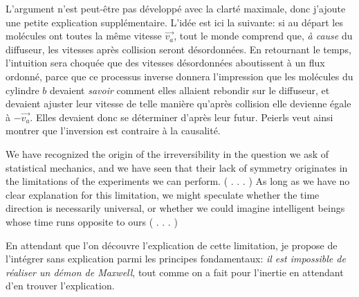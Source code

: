 \medskip
L'argument n'est peut-\^etre pas d\'evelopp\'e avec la clart\'e maximale, 
donc j'ajoute une petite explication suppl\'ementaire. L'id\'ee est ici 
la suivante: si au d\'epart les mol\'ecules ont toutes la m\^eme vitesse 
$\vec{v_a}$, tout le monde comprend que, {\it \`a cause} du diffuseur, 
les vitesses apr\`es collision seront d\'esordonn\'ees. En retournant le 
temps, l'intuition sera choqu\'ee que des vitesses d\'esordonn\'ees 
aboutissent \`a un flux ordonn\'e, parce que ce processus inverse donnera 
l'impression que les mol\'ecules du cylindre $b$ devaient {\it savoir} 
comment elles allaient rebondir sur le diffuseur, et devaient ajuster leur 
vitesse de telle mani\`ere qu'apr\`es collision elle devienne \'egale 
\`a $-\vec{v_a}$. Elles devaient donc se d\'eterminer d'apr\`es leur futur.
Peierls veut ainsi montrer que l'inversion est contraire \`a la causalit\'e. 
\medskip
{\cit We have recognized the origin of the irreversibility in the question
we ask of statistical mechanics, and we have seen that their lack of symmetry 
originates in the limitations of the experiments we can perform. ( . . . )  As
long as we have no clear explanation for this limitation, we might speculate 
whether the time direction is necessarily universal, or whether we could 
imagine intelligent beings whose time runs opposite to ours ( . . . ) \par }
\medskip
En attendant que l'on d\'ecouvre l'explication de cette limitation, je 
propose de l'int\'egrer sans explication parmi les principes fondamentaux:
{\sl il est impossible de r\'ealiser un d\'emon de Maxwell}, tout comme on 
a fait pour l'inertie en attendant d'en trouver l'explication.  

\bigskip

